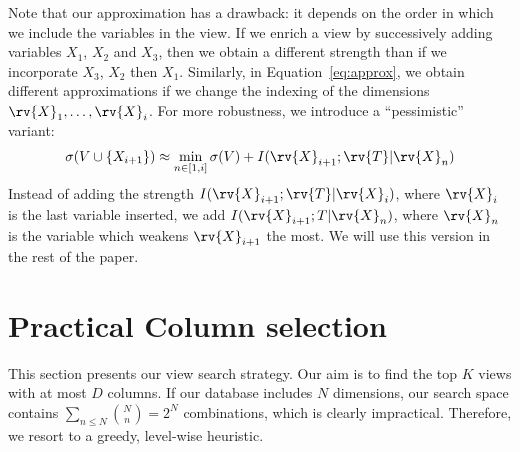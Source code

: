 Note that our approximation has a drawback: it depends on the order in which we
include the variables in the view. If we enrich a view by successively adding
variables $X_1$, $X_2$ and $X_3$, then we obtain a different strength than if
we incorporate $X_3$, $X_2$ then $X_1$. Similarly, in Equation~\ref{eq:approx},
we obtain different approximations if we change the indexing of the dimensions
$\rv{X}_1, \ldots, \rv{X}_i$.  For more robustness, we introduce a
``pessimistic'' variant:
\begin{equation}\label{eq:robustapprox}
    \sigma(V \cup \{X_{i+1}\}) 
    \approx \min_{n \in [1, i]} \sigma(V) + I(\rv{X}_{i+1} ; \rv{T} | \rv{X}_{n})
\end{equation}
Instead of adding the strength $I(\rv{X}_{i+1}; \rv{T} | \rv{X}_i)$, where
$\rv{X}_i$ is the last variable inserted, we add $I(\rv{X}_{i+1}; T |
\rv{X}_n)$, where $\rv{X}_n$ is the variable which weakens $\rv{X}_{i+1}$ the
most. We will use this version in the rest of the paper.







\section{Practical Column selection}
\label{sec:column}
This section presents our view search strategy. Our aim is to find the top $K$
views with at most $D$ columns. If our database includes $N$ dimensions, our
search space contains $\sum_{n \leq N} \binom{N}{n} = 2^N$ combinations, which
is clearly impractical. Therefore, we resort to a  greedy, level-wise
heuristic.

